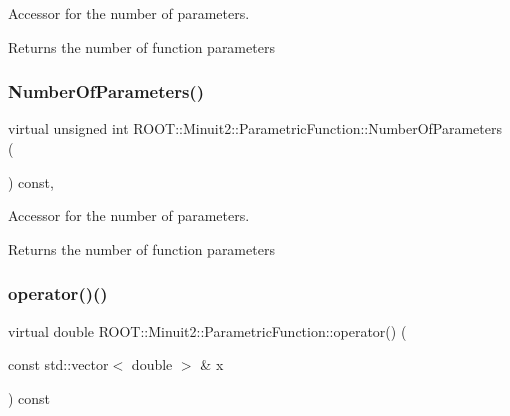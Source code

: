 Accessor for the number of parameters.

\begin{DoxyReturn}{Returns}
the number of function parameters 
\end{DoxyReturn}
\mbox{\label{classROOT_1_1Minuit2_1_1ParametricFunction_a8e5e21de5e8f6e5bedd1ae7ea27b24ac}} 
\subsubsection{\texorpdfstring{NumberOfParameters()}{NumberOfParameters()}\hspace{0.1cm}{\footnotesize\ttfamily [3/3]}}
{\footnotesize\ttfamily virtual unsigned int R\+O\+O\+T\+::\+Minuit2\+::\+Parametric\+Function\+::\+Number\+Of\+Parameters (\begin{DoxyParamCaption}{ }\end{DoxyParamCaption}) const\hspace{0.3cm}{\ttfamily [inline]}, {\ttfamily [virtual]}}

Accessor for the number of parameters.

\begin{DoxyReturn}{Returns}
the number of function parameters 
\end{DoxyReturn}
\mbox{\label{classROOT_1_1Minuit2_1_1ParametricFunction_a953426fa51c84cdef3eba24274131806}} 
\subsubsection{\texorpdfstring{operator()()}{operator()()}\hspace{0.1cm}{\footnotesize\ttfamily [1/6]}}
{\footnotesize\ttfamily virtual double R\+O\+O\+T\+::\+Minuit2\+::\+Parametric\+Function\+::operator() (\begin{DoxyParamCaption}\item[{const std\+::vector$<$ double $>$ \&}]{x }\end{DoxyParamCaption}) const\hspace{0.3cm}{\ttfamily [pure virtual]}}

